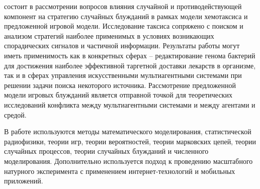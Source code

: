 {\influence} состоит в рассмотрении вопросов влияния случайной и противодействующей компонент на стратегию случайных блужданий в рамках модели хемотаксиса и предложенной игровой модели. Исследование таксиса сопряжено с поиском и анализом стратегий наиболее применимых в условиях возникающих спорадических сигналов и частичной информации. Результаты работы могут иметь применимость как в конкретных сферах -- редактирование генома бактерий для достижения наиболее эффективной таргетной доставки лекарств в организме, так и в сферах управления искусственными мультиагентными системами при решении задачи поиска некоторого источника. Рассмотрение предложенной модели игровых блужданий является отправной точкой для теоретических исследований конфликта между мультиагентными системами и между агентами и средой.

{\methods} 
В работе используются методы математического моделирования, статистической радиофизики, теории игр, теории вероятностей, теории марковских цепей, теории случайных процессов, теории случайных блужданий и численного моделирования. Дополнительно используется подход к проведению масштабного натурного эксперимента с применением интернет-технологий и мобильных приложений.


